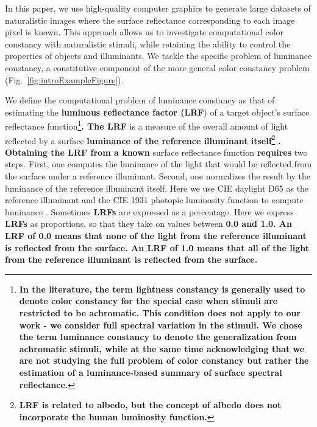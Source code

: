 \documentclass{jov}
\providecommand{\DIFaddtex}[1]{{\bf #1}} %
\providecommand{\DIFdeltex}[1]{} %
\providecommand{\DIFaddbegin}{} %
\providecommand{\DIFaddend}{} %
\providecommand{\DIFdelbegin}{} %
\providecommand{\DIFdelend}{} %
\providecommand{\DIFadd}[1]{\texorpdfstring{\DIFaddtex{#1}}{#1}} %
\providecommand{\DIFdel}[1]{\texorpdfstring{\DIFdeltex{#1}}{}} %
\newcommand{\DIFscaledelfig}{0.5}
\newlength{\DIFdelgraphicswidth} %
\newlength{\DIFdelgraphicsheight} %
\newcommand{\DIFaddincludegraphics}[2][]{{\color{blue}\fbox{\DIFOincludegraphics[#1]{#2}}}} %
\newcommand{\DIFdelincludegraphics}[2][]{%
\sbox{\DIFdelgraphicsbox}{\DIFOincludegraphics[#1]{#2}}%
\settoboxwidth{\DIFdelgraphicswidth}{\DIFdelgraphicsbox} %
\settoboxtotalheight{\DIFdelgraphicsheight}{\DIFdelgraphicsbox} %
\scalebox{\DIFscaledelfig}{%
\parbox[b]{\DIFdelgraphicswidth}{\usebox{\DIFdelgraphicsbox}\\[-\baselineskip] \rule{\DIFdelgraphicswidth}{0em}}\llap{\resizebox{\DIFdelgraphicswidth}{\DIFdelgraphicsheight}{%
\setlength{\unitlength}{\DIFdelgraphicswidth}%
\begin{picture}(1,1)%
\thicklines\linethickness{2pt} %
{\color[rgb]{1,0,0}\put(0,0){\framebox(1,1){}}}%
{\color[rgb]{1,0,0}\put(0,0){\line( 1,1){1}}}%
{\color[rgb]{1,0,0}\put(0,1){\line(1,-1){1}}}%
\end{picture}%
}\hspace*{3pt}}} %
} %
\DeclareRobustCommand{\DIFaddbegin}{\DIFOaddbegin \let\includegraphics\DIFaddincludegraphics} %
\DeclareRobustCommand{\DIFaddend}{\DIFOaddend \let\includegraphics\DIFOincludegraphics} %
\DeclareRobustCommand{\DIFdelbegin}{\DIFOdelbegin \let\includegraphics\DIFdelincludegraphics} %
\DeclareRobustCommand{\DIFdelend}{\DIFOaddend \let\includegraphics\DIFOincludegraphics} %
\begin{document}
In this paper, we use high-quality computer graphics to generate large datasets of naturalistic images where the surface reflectance corresponding to each image pixel is known. 
This approach allows us to investigate computational color constancy with naturalistic stimuli, while retaining the ability to control the properties of objects and illuminants. We tackle the specific problem of luminance constancy, a constitutive component of the more general color constancy problem (Fig.~\ref{fig:introExampleFigure}). 

We define the computational problem of luminance constancy as that of estimating the \DIFdelbegin \DIFdel{light reflectance value (LRV}\DIFdelend \DIFaddbegin \DIFadd{luminous reflectance factor (LRF}\DIFaddend ) of a target object's surface reflectance function\DIFdelbegin \DIFdel{.
The LRV }\DIFdelend \DIFaddbegin \footnote{\DIFadd{In the literature, the term lightness constancy is generally used to denote color constancy for the special case when stimuli are restricted to be achromatic. This condition does not apply to our work - we consider full spectral variation in the stimuli. We chose the term luminance constancy to denote the generalization from achromatic stimuli, while at the same time acknowledging that we are not studying the full problem of color constancy but rather the estimation of a luminance-based summary of surface spectral reflectance.}}\DIFadd{.
The LRF }\DIFaddend is a measure of the overall amount of light reflected by a surface \DIFdelbegin \DIFdel{\cite{astm1121477}.
Estimating the LRV from a }\DIFdelend \DIFaddbegin \DIFadd{luminance of the reference illuminant itself}\footnote{\DIFadd{LRF is related to albedo, but the concept of albedo does not incorporate the human luminosity function.}} \DIFadd{\cite{astm1121477}.
Obtaining the LRF from a known }\DIFaddend surface reflectance function \DIFdelbegin \DIFdel{proceeds in }\DIFdelend \DIFaddbegin \DIFadd{requires }\DIFaddend two steps.
First, one computes the luminance of the light that would be reflected from the surface under a reference illuminant.
Second, one normalizes the result by the luminance of the reference illuminant itself.
Here we use CIE daylight D65 as the reference illuminant and the CIE 1931 photopic luminosity function to compute luminance \cite{CIE86}.
Sometimes \DIFdelbegin \DIFdel{LRVs }\DIFdelend \DIFaddbegin \DIFadd{LRFs }\DIFaddend are expressed as a percentage.
Here we express \DIFdelbegin \DIFdel{LRVs }\DIFdelend \DIFaddbegin \DIFadd{LRFs }\DIFaddend as proportions, so that they take on values between \DIFdelbegin \DIFdel{0 and 1.
}\DIFdelend \DIFaddbegin \DIFadd{0.0 and 1.0. 
An LRF of 0.0 means that none of the light from the reference illuminant is reflected from the surface. 
An LRF of 1.0 means that all of the light from the reference illuminant is reflected from the surface.
}\DIFaddend 
\end{document}
